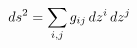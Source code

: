 \documentclass[preview]{standalone}
\begin{document}
\begin{align*}
\special{dvisvgm:raw <g id='unique000'>}ds^2 = \sum_{i,j} g_{ij}\, dz^i\, dz^j\special{dvisvgm:raw </g>}
\end{align*}
\end{document}
